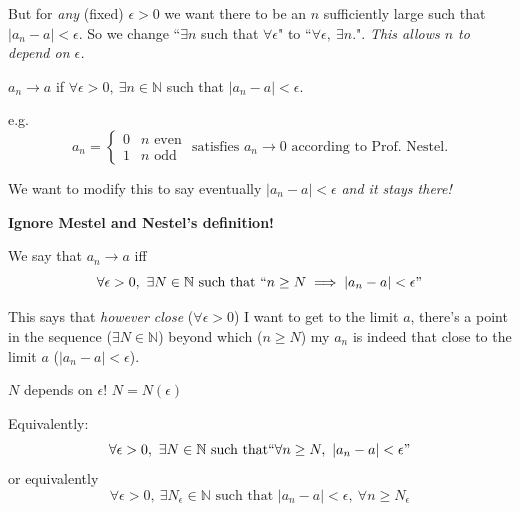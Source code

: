 \documentclass[twoside]{scrartcl}
\begin{document}
But for \emph{any} (fixed) $\epsilon>0$ we want there to be an $n$ sufficiently large such that $|a_n - a| < \epsilon$. So we change ``$\exists n$ such that $\forall \epsilon$" to ``$\forall \epsilon,~\exists n.$". \emph{This allows $n$ to depend on $\epsilon$.}~\\

\begin{definition}[Nestel]
	$a_n \to a$ if $\forall \epsilon >0,~\exists n \in \mathbb{N}$ such that $|a_n - a| < \epsilon$. 
\end{definition}

e.g. 
\[
a_n = \begin{cases}
 0 & n\text{ even}\\
 1 & n\text{ odd}	
 \end{cases}
 \text{ satisfies } a_n \to 0 \text{ according to Prof. Nestel.}
\]

We want to modify this to say eventually $|a_n - a| < \epsilon$ \emph{and it stays there!}\vspace*{5pt}

\textbf{Ignore Mestel and Nestel's definition!}\\

\begin{definition}[Convergence]
We say that $a_n \to a$ iff 
\[\forall \epsilon >0,~\exists N \in \mathbb{N} \text{ such that } ``n \geq N \implies |a_n - a| < \epsilon"\]	
\end{definition}

This says that \emph{however close} ($\forall \epsilon>0$) I want to get to the limit $a$, there's a point in the sequence ($\exists N \in \mathbb{N}$) beyond which ($n \geq N$) my $a_n$ is indeed that close to the limit $a$ ($|a_n - a| <\epsilon$).\\ 

\begin{remark}
$N$ depends on $\epsilon$! $N = N(\epsilon)$	
\end{remark}

Equivalently:
\[\forall \epsilon >0,~ \exists N \in \mathbb{N} \text{ such that} ``\forall n \geq N,~|a_n -a|<\epsilon"\]
or equivalently
\[\forall \epsilon >0,~\exists N_\epsilon\in\mathbb{N} \text{ such that } |a_n - a| < \epsilon,~\forall n \geq N_\epsilon\]
\end{document}
